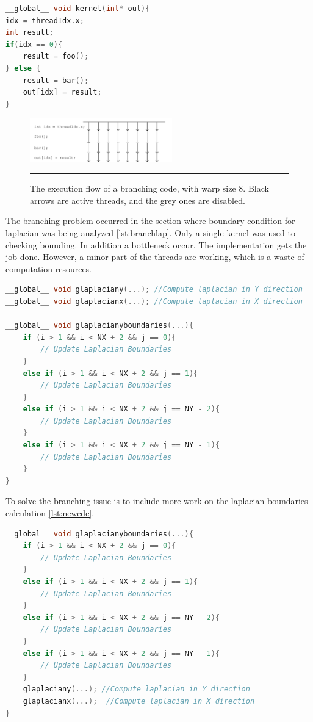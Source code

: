 \begin{lstlisting}[language=C++, label={lst:branch}, caption={Threads Branching}]
__global__ void kernel(int* out){
idx = threadIdx.x;
int result;
if(idx == 0){
	result = foo();
} else {
	result = bar();
	out[idx] = result;
}
\end{lstlisting}

\begin{figure}[htbp]
	\centering
		\includegraphics[width=0.55\textwidth]{Figures/threads.png}
		\rule{35em}{0.2pt}
	\caption[he execution flow]{The execution flow of a branching code, with warp size 8. Black arrows are active threads, and the grey ones are disabled.}
	\label{fig:threads}
\end{figure}

The branching problem occurred in the section where boundary condition for laplacian was being analyzed \ref{lst:branchlap}. Only a single kernel was used to checking bounding. In addition a bottleneck occur. The implementation gets the job done. However, a minor part of the threads are working, which is a waste of computation resources.

\begin{lstlisting}[language=C++, label={lst:branchlap}, caption={Branching problem in the laplacian boundary condition evaluation}]
__global__ void glaplaciany(...); //Compute laplacian in Y direction
__global__ void glaplacianx(...); //Compute laplacian in X direction

__global__ void glaplacianyboundaries(...){
    if (i > 1 && i < NX + 2 && j == 0){
     	// Update Laplacian Boundaries
    }
    else if (i > 1 && i < NX + 2 && j == 1){
  		// Update Laplacian Boundaries
  	}
    else if (i > 1 && i < NX + 2 && j == NY - 2){
        // Update Laplacian Boundaries
    }
    else if (i > 1 && i < NX + 2 && j == NY - 1){
        // Update Laplacian Boundaries
    }
}
\end{lstlisting}

To solve the branching issue is to include more work on the laplacian boundaries calculation \ref{lst:newcde}.
\begin{lstlisting}[language=C++, label={lst:newcde}, caption={More workload on a single kernel execution}]
__global__ void glaplacianyboundaries(...){
    if (i > 1 && i < NX + 2 && j == 0){
     	// Update Laplacian Boundaries
    }
    else if (i > 1 && i < NX + 2 && j == 1){
  		// Update Laplacian Boundaries
    }
    else if (i > 1 && i < NX + 2 && j == NY - 2){
        // Update Laplacian Boundaries
    }
    else if (i > 1 && i < NX + 2 && j == NY - 1){
        // Update Laplacian Boundaries
    }
    glaplaciany(...); //Compute laplacian in Y direction
	glaplacianx(...);  //Compute laplacian in X direction
}
\end{lstlisting}

